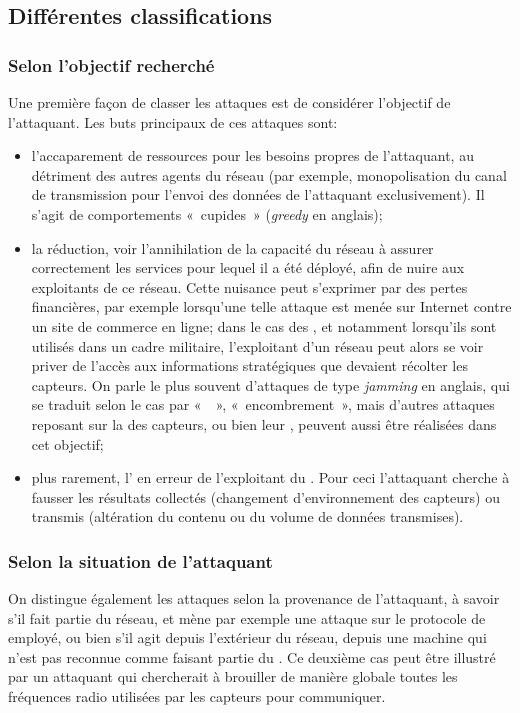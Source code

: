 \subsection{Différentes classifications}

    \subsubsection{Selon l'objectif recherché}
Une première façon de classer les attaques est de considérer l'objectif de l'attaquant.
Les buts principaux de ces attaques sont:
\begin{itemize}
    \item l'accaparement de ressources pour les besoins propres de l'attaquant, au détriment des autres agents du réseau (par exemple, monopolisation du canal de transmission pour l'envoi des données de l'attaquant exclusivement). Il s'agit de comportements « cupides » (\textit{greedy} en anglais);
    \item la réduction, voir l'annihilation de la capacité du réseau à assurer correctement les services pour lequel il a été déployé, afin de nuire aux exploitants de ce réseau. Cette nuisance peut s'exprimer par des pertes financières, par exemple lorsqu'une telle attaque est menée sur Internet contre un site de commerce en ligne; dans le cas des \rcsfs, et notamment lorsqu'ils sont utilisés dans un cadre militaire, l'exploitant d'un réseau peut alors se voir priver de l'accès aux informations stratégiques que devaient récolter les capteurs. On parle le plus souvent d'attaques de type \textit{jamming} en anglais, qui se traduit selon le cas par «  », « encombrement », mais d'autres attaques reposant sur la  des capteurs, ou bien leur , peuvent aussi être réalisées dans cet objectif;
    \item plus rarement, l' en erreur de l'exploitant du \rc. Pour ceci l'attaquant cherche à fausser les résultats collectés (changement d'environnement des capteurs) ou transmis (altération du contenu ou du volume de données transmises).
\end{itemize}

    \subsubsection{Selon la situation de l'attaquant}
On distingue également les attaques selon la provenance de l'attaquant, à savoir s'il fait partie du réseau, et mène par exemple une attaque sur le protocole de  employé, ou bien s'il agit depuis l'extérieur du réseau, depuis une machine qui n'est pas reconnue comme faisant partie du \rc.
Ce deuxième cas peut être illustré par un attaquant qui chercherait à brouiller de manière globale toutes les fréquences radio utilisées par les capteurs pour communiquer.

